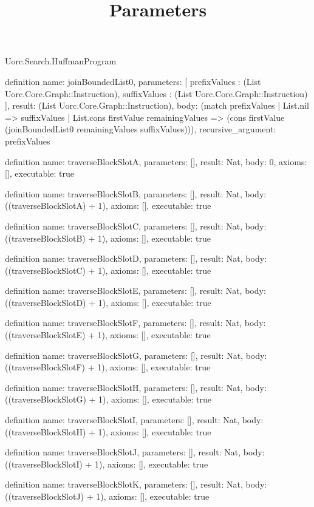 \begin{lexlean}{Uorc.Search.HuffmanProgram}
\title{Parameters}
\begin{semanticmodule}
definition{
  name: joinBoundedList0,
  parameters: [
    prefixValues : (List Uorc.Core.Graph::Instruction),
    suffixValues : (List Uorc.Core.Graph::Instruction)
  ],
  result: (List Uorc.Core.Graph::Instruction),
  body: (match prefixValues
    | List.nil => suffixValues
    | List.cons firstValue remainingValues => (cons firstValue (joinBoundedList0 remainingValues suffixValues))),
  recursive_argument: prefixValues
}

definition{
  name: traverseBlockSlotA,
  parameters: [],
  result: Nat,
  body: 0,
  axioms: [],
  executable: true
}

definition{
  name: traverseBlockSlotB,
  parameters: [],
  result: Nat,
  body: ((traverseBlockSlotA) + 1),
  axioms: [],
  executable: true
}

definition{
  name: traverseBlockSlotC,
  parameters: [],
  result: Nat,
  body: ((traverseBlockSlotB) + 1),
  axioms: [],
  executable: true
}

definition{
  name: traverseBlockSlotD,
  parameters: [],
  result: Nat,
  body: ((traverseBlockSlotC) + 1),
  axioms: [],
  executable: true
}

definition{
  name: traverseBlockSlotE,
  parameters: [],
  result: Nat,
  body: ((traverseBlockSlotD) + 1),
  axioms: [],
  executable: true
}

definition{
  name: traverseBlockSlotF,
  parameters: [],
  result: Nat,
  body: ((traverseBlockSlotE) + 1),
  axioms: [],
  executable: true
}

definition{
  name: traverseBlockSlotG,
  parameters: [],
  result: Nat,
  body: ((traverseBlockSlotF) + 1),
  axioms: [],
  executable: true
}

definition{
  name: traverseBlockSlotH,
  parameters: [],
  result: Nat,
  body: ((traverseBlockSlotG) + 1),
  axioms: [],
  executable: true
}

definition{
  name: traverseBlockSlotI,
  parameters: [],
  result: Nat,
  body: ((traverseBlockSlotH) + 1),
  axioms: [],
  executable: true
}

definition{
  name: traverseBlockSlotJ,
  parameters: [],
  result: Nat,
  body: ((traverseBlockSlotI) + 1),
  axioms: [],
  executable: true
}

definition{
  name: traverseBlockSlotK,
  parameters: [],
  result: Nat,
  body: ((traverseBlockSlotJ) + 1),
  axioms: [],
  executable: true
}


\end{semanticmodule}
\end{lexlean}
